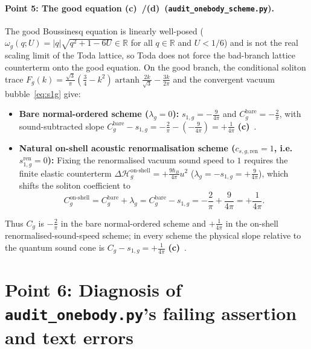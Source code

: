 \documentclass[11pt,a4paper]{article}
\newcommand{\Lc}{\textbf{(c)}\ }
\newcommand{\Ld}{\textbf{(d)}\ }
\newcommand{\scr}{\texttt{audit\_\allowbreak onebody\_\allowbreak scheme.py}}
\begin{document}
\paragraph{Point 5: The good equation \Lc/\Ld (\scr).}
The good Boussinesq equation is linearly well-posed ($\omega_g(q;U) = |q|\sqrt{q^2+1-6U} \in \mathbb{R}$
for all $q\in\mathbb{R}$ and $U<1/6$) and is not the real scaling limit of the Toda lattice,
so Toda does not force the bad-branch lattice counterterm onto the good equation.
On the good branch, the conditional soliton trace
$F_g(k) = \frac{\sqrt{3}}{\pi}(\frac{3}{4}-k^2)\operatorname{artanh}\frac{2k}{\sqrt{3}} - \frac{3k}{2\pi}$
and the convergent vacuum bubble~\eqref{eq:s1g} give:
\begin{itemize}
  \item \textbf{Bare normal-ordered scheme ($\lambda_g = 0$):}
  $s_{1,g} = -\frac{9}{4\pi}$ and $C_g^{\mathrm{bare}} = -\frac{2}{\pi}$, with
  sound-subtracted slope $C_g^{\mathrm{bare}} - s_{1,g} = -\frac{2}{\pi} - (-\frac{9}{4\pi}) = +\frac{1}{4\pi}$ \Lc.
  \item \textbf{Natural on-shell acoustic renormalisation scheme ($c_{s,g,\mathrm{ren}} = 1$, i.e.\ $s_{1,g}^{\mathrm{ren}} = 0$):}
  Fixing the renormalised vacuum sound speed to $1$ requires the finite elastic counterterm
  $\Delta\mathcal{H}_g^{\mathrm{on\text{-}shell}} = +\frac{9\hbar_B}{4\pi}u^2$ ($\lambda_g = -s_{1,g} = +\frac{9}{4\pi}$),
  which shifts the soliton coefficient to
  \begin{equation}
    C_g^{\mathrm{on\text{-}shell}} = C_g^{\mathrm{bare}} + \lambda_g
    = C_g^{\mathrm{bare}} - s_{1,g} = -\frac{2}{\pi} + \frac{9}{4\pi} = +\frac{1}{4\pi}.
  \end{equation}
\end{itemize}
Thus $C_g$ is $-\frac{2}{\pi}$ in the bare normal-ordered scheme and $+\frac{1}{4\pi}$
in the on-shell renormalised-sound-speed scheme; in every scheme the physical slope
relative to the quantum sound cone is $C_g - s_{1,g} = +\frac{1}{4\pi}$ \Lc.

\section{Point 6: Diagnosis of \texttt{audit\_onebody.py}'s failing assertion and text errors}
\end{document}
